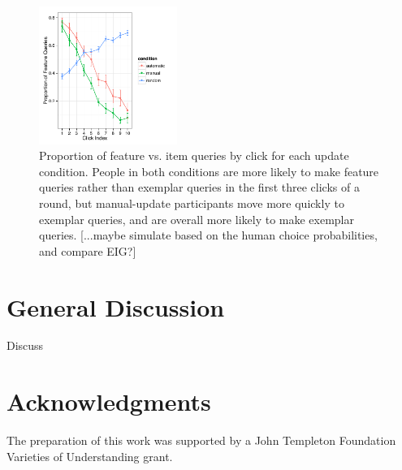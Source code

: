 \documentclass[10pt,letterpaper]{article}
\begin{document}
\begin{figure}[!h]
  \centering
  \includegraphics[width=0.4\textwidth]{figures/query_type_prop_by_click}
  \caption{Proportion of feature vs. item queries by click for each update condition. People in both conditions are more likely to make feature queries rather than exemplar queries in the first three clicks of a round, but manual-update participants move more quickly to exemplar queries, and are overall more likely to make exemplar queries.  [...maybe simulate based on the human choice probabilities, and compare EIG?]}
  \label{fig:query-prop-click}
\end{figure} 

\section{General Discussion}

Discuss

\section{Acknowledgments}

The preparation of this work was supported by a John Templeton Foundation Varieties of Understanding grant.



\setlength{\bibleftmargin}{.125in}
\setlength{\bibindent}{-\bibleftmargin}


\end{document}
